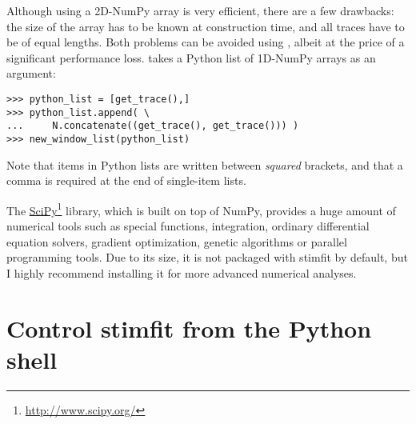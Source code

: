 Although using a 2D-NumPy array is very efficient, there are a few drawbacks: the size of the array has to be known at construction time, and all traces have to be of equal lengths. Both problems can be avoided using , albeit at the price of a significant performance loss.  takes a Python list of 1D-NumPy arrays as an argument:
\begin{lstlisting}
>>> python_list = [get_trace(),]
>>> python_list.append( \
...     N.concatenate((get_trace(), get_trace())) )
>>> new_window_list(python_list)
\end{lstlisting}
Note that items in Python lists are written between \textit{squared} brackets, and that a comma is required at the end of single-item lists.

The \href{http://www.scipy.org}{SciPy}\footnote{\url{http://www.scipy.org/}} library, which is built on top of NumPy, provides a huge amount of numerical tools such as special functions, integration, ordinary differential equation sol\-vers, gradient optimization, genetic algorithms or parallel programming tools. Due to its size, it is not packaged with stimfit by default, but I highly recommend installing it for more advanced numerical analyses.

\section{Control stimfit from the Python shell}
